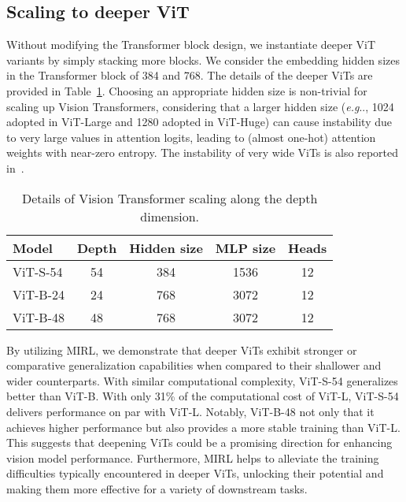 \documentclass{article}
\makeatletter
\DeclareRobustCommand\onedot{\futurelet\@let@token\@onedot}
\def\@onedot{\ifx\@let@token.\else.\null\fi\xspace}
\def\eg{\emph{e.g}\onedot} \def\Eg{\emph{E.g}\onedot}
\makeatother
\begin{document}
\vspace{5pt}
\subsection{Scaling to deeper ViT}
\label{sec: Scaling to Deeper ViT}
\vspace{5pt}
Without modifying the Transformer block design, we instantiate deeper ViT variants by simply stacking more blocks. We consider the embedding hidden sizes in the Transformer block of 384 and 768. The details of the deeper ViTs are provided in Table~\ref{tab: details_vitd}.
Choosing an appropriate hidden size is non-trivial for scaling up Vision Transformers, considering that a larger hidden size (\eg, 1024 adopted in ViT-Large and 1280 adopted in ViT-Huge) can cause instability due to very large values in attention logits, leading to (almost one-hot) attention weights with near-zero entropy. 
The instability of very wide ViTs is also reported in~\cite{he2022masked,dehghani2023scaling}.

\begin{table}[htbp]
    \caption{Details of Vision Transformer scaling along the depth dimension.}
\centering
    \setlength{\tabcolsep}{30pt}
    \renewcommand{\arraystretch}{1.1}
    \small
    \begin{tabular}{@{}l c c c c@{}}
    \\
    \toprule
     Model & Depth  & Hidden size & MLP size & Heads   \\
    \midrule
     ViT-S-54 & 54 & 384 & 1536 & 12  \\
     ViT-B-24 & 24 & 768 & 3072 & 12 \\
     ViT-B-48 & 48 & 768 & 3072 & 12  \\
    \bottomrule
    \end{tabular}

    \label{tab: details_vitd}
\end{table}

By utilizing MIRL, we demonstrate that deeper ViTs exhibit stronger or comparative generalization capabilities when compared to their shallower and wider counterparts. 
With similar computational complexity, ViT-S-54 generalizes better than ViT-B. With only 31\% of the computational cost of ViT-L, ViT-S-54 delivers performance on par with ViT-L.
Notably, ViT-B-48 not only that it achieves higher performance but also provides a more stable training than ViT-L. This suggests that deepening ViTs could be a promising direction for enhancing vision model performance. Furthermore, MIRL helps to alleviate the training difficulties typically encountered in deeper ViTs, unlocking their potential and making them more effective for a variety of downstream tasks.
\end{document}
